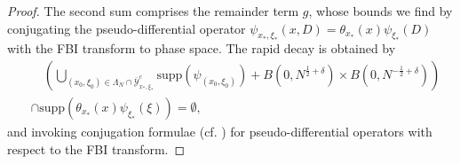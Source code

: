 \documentclass{amsart}
\numberwithin{equation}{section}
\theoremstyle{definition}
\begin{document}
\begin{proof}
The second sum comprises the remainder term $g$, whose bounds we find by conjugating the pseudo-differential operator $\psi_{x_*,\xi_*}(x,D) = \theta_{x_*}(x) \psi_{\xi_{*}}(D)$ with the FBI transform to phase space. The rapid decay is obtained by 
\begin{equation*}
\begin{split}
    &\quad (\bigcup_{(x_0,\xi_0) \in \Lambda_N \cap \overline{\mathcal{Y}}_{x_*,\xi_{*}}^c} \text{supp}(\psi_{(x_0,\xi_0)}) + B(0,N^{\frac{1}{2}+\delta}) \times B(0,N^{-\frac{1}{2}+\delta})) \\
    &\cap \text{supp}(\theta_{x_*}(x) \psi_{\xi_{*}}(\xi))= \emptyset,
    \end{split}
\end{equation*}
and invoking conjugation formulae (cf. \cite[Theorem~5]{Tataru2001}) for pseudo-differential operators with respect to the FBI transform.


\end{proof}
\end{document}
